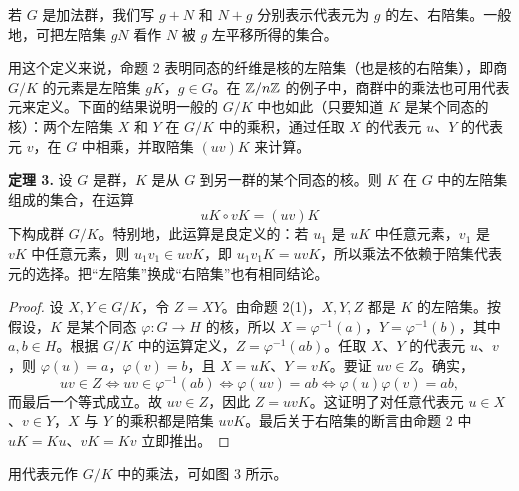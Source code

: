 若 $G$ 是加法群，我们写 $g+N$ 和 $N+g$ 分别表示代表元为 $g$ 的左、右陪集。一般地，可把左陪集 $gN$ 看作 $N$ 被 $g$ 左平移所得的集合。

用这个定义来说，命题 2 表明同态的纤维是核的左陪集（也是核的右陪集），即商 $G/K$ 的元素是左陪集 $gK$，$g\in G$。在 $\mathbb{Z}/n\mathbb{Z}$ 的例子中，商群中的乘法也可用代表元来定义。下面的结果说明一般的 $G/K$ 中也如此（只要知道 $K$ 是某个同态的核）：两个左陪集 $X$ 和 $Y$ 在 $G/K$ 中的乘积，通过任取 $X$ 的代表元 $u$、$Y$ 的代表元 $v$，在 $G$ 中相乘，并取陪集 $(uv)K$ 来计算。

\medskip
\noindent\textbf{定理 3.} 设 $G$ 是群，$K$ 是从 $G$ 到另一群的某个同态的核。则 $K$ 在 $G$ 中的左陪集组成的集合，在运算
\[
  uK\circ vK=(uv)K
\]
下构成群 $G/K$。特别地，此运算是良定义的：若 $u_1$ 是 $uK$ 中任意元素，$v_1$ 是 $vK$ 中任意元素，则 $u_1v_1\in uvK$，即 $u_1v_1K=uvK$，所以乘法不依赖于陪集代表元的选择。把“左陪集”换成“右陪集”也有相同结论。

\begin{proof}
设 $X,Y\in G/K$，令 $Z=XY$。由命题 2(1)，$X,Y,Z$ 都是 $K$ 的左陪集。按假设，$K$ 是某个同态 $\varphi:G\to H$ 的核，所以 $X=\varphi^{-1}(a)$，$Y=\varphi^{-1}(b)$，其中 $a,b\in H$。根据 $G/K$ 中的运算定义，$Z=\varphi^{-1}(ab)$。任取 $X$、$Y$ 的代表元 $u$、$v$，则 $\varphi(u)=a$，$\varphi(v)=b$，且 $X=uK$、$Y=vK$。要证 $uv\in Z$。确实，
\[
  uv\in Z \Longleftrightarrow uv\in\varphi^{-1}(ab)
  \Longleftrightarrow \varphi(uv)=ab
  \Longleftrightarrow \varphi(u)\varphi(v)=ab,
\]
而最后一个等式成立。故 $uv\in Z$，因此 $Z=uvK$。这证明了对任意代表元 $u\in X$、$v\in Y$，$X$ 与 $Y$ 的乘积都是陪集 $uvK$。最后关于右陪集的断言由命题 2 中 $uK=Ku$、$vK=Kv$ 立即推出。
\end{proof}

用代表元作 $G/K$ 中的乘法，可如图 3 所示。

\begin{center}
\end{center}

